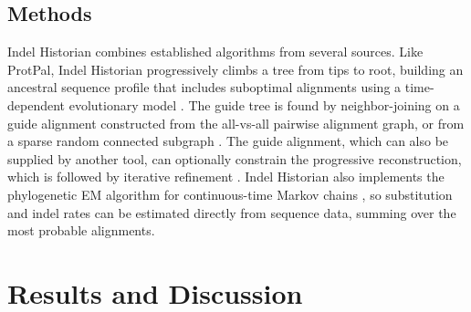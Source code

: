 \documentclass{bioinfo}
\begin{document}
\begin{methods}
\section{Methods}

Indel Historian combines established algorithms from several sources.
Like ProtPal, Indel Historian progressively climbs a tree from tips to root,
building an ancestral sequence profile that includes suboptimal alignments \citep{LeeGrassoSharlow2002,Westesson2012-zg}
using a time-dependent evolutionary model \citep{RivasEddy2015}.
The guide tree is found by neighbor-joining %
on a guide alignment constructed from the all-vs-all pairwise alignment graph,
or from a sparse random connected subgraph \citep{BradleyEtAl2009}.
The guide alignment, which can also be supplied by another tool,
can optionally constrain the progressive reconstruction,
which is followed by iterative refinement \citep{HolmesBruno2001,Edgar2004b}.
Indel Historian also implements the phylogenetic EM algorithm for continuous-time Markov chains \citep{HolmesRubin2002},
so substitution and indel rates can be estimated directly from sequence data,
summing over the most probable alignments.

\end{methods}

\section{Results and Discussion}
\end{document}
